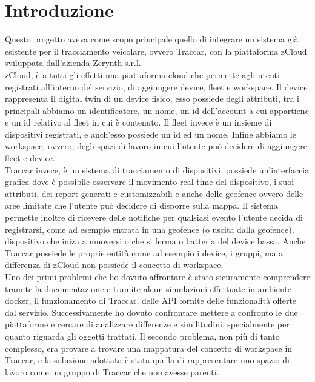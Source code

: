 \documentclass[a4paper,titlepage,12pt]{book}
\begin{document}
\chapter{
\sffamily
Introduzione}
Questo progetto aveva come scopo principale quello di integrare un sistema già esistente per il tracciamento veicolare, ovvero Traccar, con la piattaforma zCloud sviluppata dall'azienda Zerynth s.r.l.\\
zCloud, è a tutti gli effetti una piattaforma cloud che permette agli utenti registrati all'interno del servizio, di aggiungere device, fleet e workspace. Il device rappresenta il digital twin di un device fisico, esso possiede degli attributi, tra i principali abbiamo un identificatore, un nome, un id dell'account a cui appartiene e un id relativo al fleet in cui è contenuto. Il fleet invece è un insieme di dispositivi registrati, e anch'esso possiede un id ed un nome. Infine abbiamo le workspace, ovvero, degli spazi di lavoro in cui l'utente può decidere di aggiungere fleet e device.\\
Traccar invece, è un sistema di tracciamento di dispositivi, possiede un'interfaccia grafica dove è possibile osservare il movimento real-time del dispositivo, i suoi attributi, dei report generati e customizzabili e anche delle geofence ovvero delle aree limitate che l'utente può decidere di disporre sulla mappa. Il sistema permette inoltre di ricevere delle notifiche per qualsiasi evento l'utente decida di registrarsi, come ad esempio entrata in una geofence (o uscita dalla geofence), dispositivo che iniza a muoversi o che si ferma o batteria del device bassa. Anche Traccar possiede le proprie entità come ad esempio i device, i gruppi, ma a differenza di zCloud non possiede il concetto di workspace.\\
Uno dei primi problemi che ho dovuto affrontare è stato sicuramente comprendere tramite la documentazione e tramite alcun simulazioni effettuate in ambiente docker, il funzionamento di Traccar, delle API fornite delle funzionalità offerte dal servizio. Successivamente ho dovuto confrontare mettere a confronto le due piattaforme e cercare di analizzare differenze e similitudini, specialmente per quanto riguarda gli oggetti trattati. Il secondo problema, non più di tanto complesso, era provare a trovare una mappatura del concetto di workspace in Traccar,  e la soluzione adottata è stata quella di rappresentare uno spazio di lavoro come un gruppo di Traccar che non avesse parenti. \\
\end{document}
